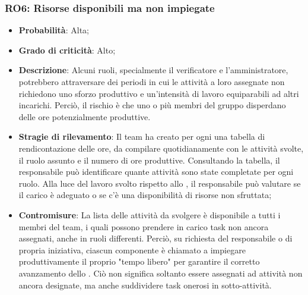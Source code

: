 \subsubsection{RO6: Risorse disponibili ma non impiegate}
\begin{itemize}
    \item \textbf{Probabilità}: Alta;
    \item \textbf{Grado di criticità}: Alto;
    \item \textbf{Descrizione}: Alcuni ruoli, specialmente il verificatore e l'amministratore, potrebbero attraversare dei periodi in cui le attività a loro assegnate non richiedono uno sforzo produttivo e un'intensità di lavoro equiparabili ad altri incarichi. Perciò, il rischio è che uno o più membri del gruppo disperdano delle ore potenzialmente produttive.
    \item \textbf{Stragie di rilevamento}: Il team ha creato per ogni  una tabella di rendicontazione delle ore, da compilare quotidianamente con le attività svolte, il ruolo assunto e il numero di ore produttive. Consultando la tabella, il responsabile può identificare quante attività sono state completate per ogni ruolo. Alla luce del lavoro svolto rispetto allo , il responsabile può valutare se il carico è adeguato o se c'è una disponibilità di risorse non sfruttata;
    \item \textbf{Contromisure}: La lista delle attività da svolgere è disponibile a tutti i membri del team, i quali possono prendere in carico task non ancora assegnati, anche in ruoli differenti. Perciò, su richiesta del responsabile o di propria iniziativa, ciascun componente è chiamato a impiegare produttivamente il proprio "tempo libero" per garantire il corretto avanzamento dello . Ciò non significa soltanto essere assegnati ad attività non ancora designate, ma anche suddividere task onerosi in sotto-attività. 
\end{itemize}
